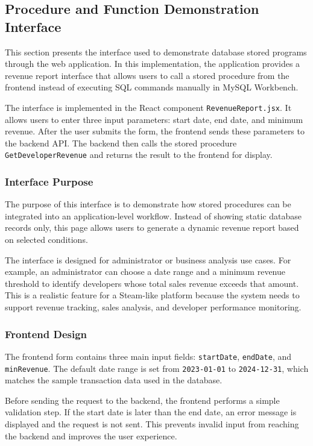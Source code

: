\subsection{Procedure and Function Demonstration Interface}

This section presents the interface used to demonstrate database stored programs through the web application. 
In this implementation, the application provides a revenue report interface that allows users to call a stored procedure from the frontend instead of executing SQL commands manually in MySQL Workbench.

The interface is implemented in the React component \texttt{RevenueReport.jsx}. 
It allows users to enter three input parameters: start date, end date, and minimum revenue. 
After the user submits the form, the frontend sends these parameters to the backend API. 
The backend then calls the stored procedure \texttt{GetDeveloperRevenue} and returns the result to the frontend for display.
\subsubsection{Interface Purpose}

The purpose of this interface is to demonstrate how stored procedures can be integrated into an application-level workflow. 
Instead of showing static database records only, this page allows users to generate a dynamic revenue report based on selected conditions.

The interface is designed for administrator or business analysis use cases. 
For example, an administrator can choose a date range and a minimum revenue threshold to identify developers whose total sales revenue exceeds that amount. 
This is a realistic feature for a Steam-like platform because the system needs to support revenue tracking, sales analysis, and developer performance monitoring.
\subsubsection{Frontend Design}

The frontend form contains three main input fields: \texttt{startDate}, \texttt{endDate}, and \texttt{minRevenue}. 
The default date range is set from \texttt{2023-01-01} to \texttt{2024-12-31}, which matches the sample transaction data used in the database.

Before sending the request to the backend, the frontend performs a simple validation step. 
If the start date is later than the end date, an error message is displayed and the request is not sent. 
This prevents invalid input from reaching the backend and improves the user experience.

